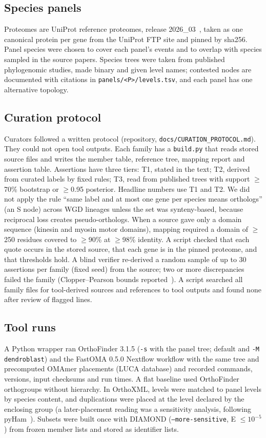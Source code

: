 \subsection*{Species panels}
Proteomes are UniProt reference proteomes, release 2026\_03~\cite{uniprot2025}, taken as one canonical protein per gene
from the UniProt FTP site and pinned by sha256. Panel species were chosen to cover each panel's events and to overlap
with species sampled in the source papers. Species trees were taken from published phylogenomic studies, made binary
and given level names; contested nodes are documented with citations in \texttt{panels/<P>/levels.tsv}, and each panel
has one alternative topology.

\subsection*{Curation protocol}
Curators followed a written protocol (repository, \texttt{docs/CURATION\_PROTOCOL.md}). They could not open tool
outputs. Each family has a \texttt{build.py} that reads stored source files and writes the member table, reference
tree, mapping report and assertion table. Assertions have three tiers: T1, stated in the text; T2, derived from curated
labels by fixed rules; T3, read from published trees with support $\geq$70\% bootstrap or $\geq$0.95 posterior. Headline
numbers use T1 and T2. We did not apply the rule ``same label and at most one gene per species means orthologs'' (an S
node) across WGD lineages unless the set was synteny-based, because reciprocal loss creates
pseudo-orthologs. When a source gave only a domain sequence (kinesin and myosin motor domains), mapping required a
domain of $\geq$250 residues covered to $\geq$90\% at $\geq$98\% identity. A script checked that each quote occurs in
the stored source, that each gene is in the pinned proteome, and that thresholds hold. A blind verifier re-derived
a random sample of up to 30 assertions per family (fixed seed) from the source; two or more discrepancies failed the family (Clopper--Pearson
bounds reported~\cite{clopper1934}). A script searched all family files for tool-derived sources and references to tool
outputs and found none after review of flagged lines.

\subsection*{Tool runs}
A Python wrapper ran OrthoFinder 3.1.5 (\texttt{-s} with the panel tree; default and \texttt{-M dendroblast}) and the
FastOMA 0.5.0 Nextflow workflow with the same tree and precomputed OMAmer placements (LUCA database) and recorded
commands, versions, input checksums and run times. A flat baseline used OrthoFinder orthogroups without hierarchy. In
OrthoXML, levels were matched to panel levels by species content, and duplications were placed at the level declared
by the enclosing group (a later-placement reading was a sensitivity analysis, following pyHam~\cite{train2019pyham}).
Subsets were built once with DIAMOND (\texttt{--more-sensitive}, E $\leq10^{-5}$) from frozen member lists and stored
as identifier lists.

